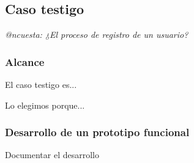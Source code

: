 \subsection{Caso testigo}
\label{caso-testigo}


\textit{@ncuesta: ¿El proceso de registro de un usuario?}

\subsubsection{Alcance}

El caso testigo es...

Lo elegimos porque...


\subsubsection{Desarrollo de un prototipo funcional}

Documentar el desarrollo
